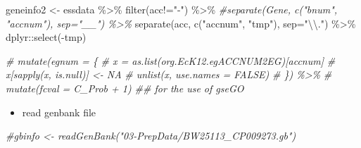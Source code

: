 \documentclass[
]{book}
\newenvironment{Shaded}{\begin{snugshade}}{\end{snugshade}}
\newcommand{\AttributeTok}[1]{\textcolor[rgb]{0.77,0.63,0.00}{#1}}
\newcommand{\CommentTok}[1]{\textcolor[rgb]{0.56,0.35,0.01}{\textit{#1}}}
\newcommand{\FunctionTok}[1]{\textcolor[rgb]{0.00,0.00,0.00}{#1}}
\newcommand{\NormalTok}[1]{#1}
\newcommand{\OtherTok}[1]{\textcolor[rgb]{0.56,0.35,0.01}{#1}}
\newcommand{\SpecialCharTok}[1]{\textcolor[rgb]{0.00,0.00,0.00}{#1}}
\newcommand{\StringTok}[1]{\textcolor[rgb]{0.31,0.60,0.02}{#1}}
\providecommand{\tightlist}{%
  \setlength{\itemsep}{0pt}\setlength{\parskip}{0pt}}
\begin{document}
\begin{Shaded}
\begin{Highlighting}[]
\NormalTok{geneinfo2 }\OtherTok{\textless{}{-}}\NormalTok{ essdata }\SpecialCharTok{\%\textgreater{}\%} 
  \FunctionTok{filter}\NormalTok{(acc}\SpecialCharTok{!=}\StringTok{"{-}"}\NormalTok{) }\SpecialCharTok{\%\textgreater{}\%} 
  \CommentTok{\#separate(Gene, c("bnum", "accnum"), sep="\_\_") \%\textgreater{}\% }
  \FunctionTok{separate}\NormalTok{(acc, }\FunctionTok{c}\NormalTok{(}\StringTok{"accnum"}\NormalTok{, }\StringTok{"tmp"}\NormalTok{), }\AttributeTok{sep=}\StringTok{"}\SpecialCharTok{\textbackslash{}\textbackslash{}}\StringTok{."}\NormalTok{) }\SpecialCharTok{\%\textgreater{}\%} 
\NormalTok{  dplyr}\SpecialCharTok{::}\FunctionTok{select}\NormalTok{(}\SpecialCharTok{{-}}\NormalTok{tmp)}

  \CommentTok{\# mutate(egnum = \{}
  \CommentTok{\#   x = as.list(org.EcK12.egACCNUM2EG)[accnum]}
  \CommentTok{\#   x[sapply(x, is.null)] \textless{}{-} NA}
  \CommentTok{\#   unlist(x, use.names = FALSE)}
  \CommentTok{\#   \}) \%\textgreater{}\% }
  \CommentTok{\# mutate(fcval = C\_Prob + 1) \#\# for the use of gseGO}
\end{Highlighting}
\end{Shaded}

\begin{itemize}
\tightlist
\item
  read genbank file
\end{itemize}

\begin{Shaded}
\begin{Highlighting}[]
\CommentTok{\#gbinfo \textless{}{-} readGenBank("03{-}PrepData/BW25113\_CP009273.gb")}
\end{Highlighting}
\end{Shaded}
\end{document}
